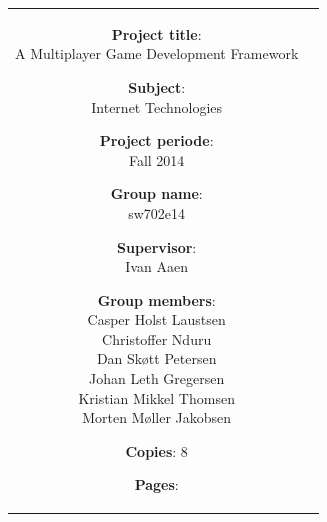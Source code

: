     \begin{tabular}{cc}
	
        \parbox[3cm]{7cm}{ %
	\vspace{7mm}
            \begin{description}
                \item {\textbf{Project title}:} \\
                    A Multiplayer Game Development Framework
                    \hspace{4cm}
                \item {\textbf{Subject}:} \\
                    Internet Technologies
            \end{description}
	\vspace{-4mm}
            \parbox{8cm}{ %
                \begin{description}
                    \item {\textbf{Project periode}:} \\
                        Fall 2014
                    \hspace{4cm}
                    \item {\textbf{Group name}:} \\
                        sw702e14
                    \hspace{4cm}
                    \item {\textbf{Supervisor}:} \\
                        Ivan Aaen
                    \item {\textbf{Group members}:}\\%
                    Casper Holst Laustsen\\[0.20cm]
                    Christoffer Nduru\\[0.20cm]
                    Dan Skøtt Petersen\\[0.20cm]
                    Johan Leth Gregersen\\[0.20cm]
                    Kristian Mikkel Thomsen\\[0.20cm]
                    Morten Møller Jakobsen
                \end{description}
            }
	    \vspace{-4mm}
            \begin{description}
                \item {\textbf{Copies}:} 8
                \item {\textbf{Pages}:} \pageref{LastPage}

\end{description}}
\end{tabular}
